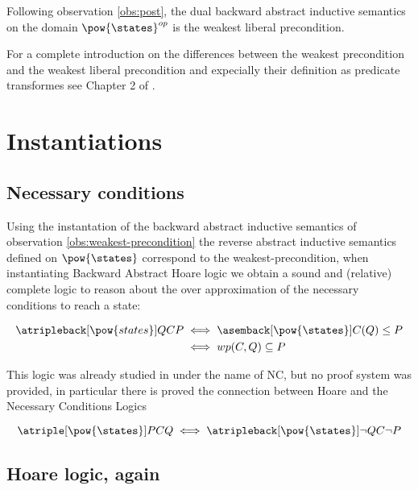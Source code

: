 \begin{observation}
  \label{obs:weakest-liberal-precondition}
  Following observation \ref{obs:post}, the dual backward 
  abstract inductive semantics on the domain $\pow{\states}^{op}$ is the weakest 
  liberal precondition.
\end{observation}

For a complete introduction on the differences between the weakest precondition
and the weakest liberal precondition and expecially their definition as
predicate transformes see Chapter 2 of \cite{Kaminski19}.

\section{Instantiations}

\subsection{Necessary conditions}

Using the instantation of the backward abstract inductive semantics of 
observation \ref{obs:weakest-precondition} the reverse abstract inductive semantics
defined on $\pow{\states}$ correspond to the weakest-precondition, when 
instantiating Backward Abstract Hoare logic we obtain a sound and (relative) 
complete logic to reason about the over approximation of the necessary 
conditions to reach a state:

\begin{align*}
  \atripleback[\pow{states}]{Q}{C}{P} 
    & \iff \asemback[\pow{\states}]{C}(Q) \leq P \\
    & \iff wp(C, Q) \subseteq P
\end{align*}

This logic was already studied in \cite{Ascari24} under the name of NC, 
but no proof system was provided, in particular there is proved the connection 
between Hoare and the Necessary Conditions Logics

\begin{theorem}
  $$\atriple[\pow{\states}]{P}{C}{Q} \iff \atripleback[\pow{\states}]{\neg Q}{C}
  {\neg P}$$
\end{theorem}

\subsection{Hoare logic, again}

